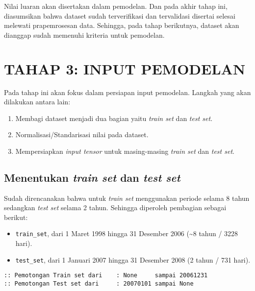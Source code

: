 \documentclass[11pt]{article}
\providecommand{\tightlist}{%
      \setlength{\itemsep}{0pt}\setlength{\parskip}{0pt}}
\let\oldsection\section
\renewcommand\section{\clearpage\oldsection}
\begin{document}
Nilai luaran akan disertakan dalam pemodelan. Dan pada akhir tahap ini,
diasumsikan bahwa dataset sudah terverifikasi dan tervalidasi disertai
selesai melewati prapemrosesan data. Sehingga, pada tahap berikutnya,
dataset akan dianggap sudah memenuhi kriteria untuk pemodelan.

    \hypertarget{tahap-3-input-pemodelan}{%
\section{TAHAP 3: INPUT PEMODELAN}\label{tahap-3-input-pemodelan}}

Pada tahap ini akan fokus dalam persiapan input pemodelan. Langkah yang
akan dilakukan antara lain:

\begin{enumerate}
\def\labelenumi{\arabic{enumi}.}
\tightlist
\item
  Membagi dataset menjadi dua bagian yaitu \emph{train set} dan
  \emph{test set}.
\item
  Normalisasi/Standarisasi nilai pada dataset.
\item
  Mempersiapkan \emph{input tensor} untuk masing-masing \emph{train set}
  dan \emph{test set}.
\end{enumerate}

    \hypertarget{menentukan-train-set-dan-test-set}{%
\subsection{\texorpdfstring{Menentukan \emph{train set} dan \emph{test
set}}{Menentukan train set dan test set}}\label{menentukan-train-set-dan-test-set}}

Sudah direncanakan bahwa untuk \emph{train set} menggunakan periode
selama 8 tahun sedangkan \emph{test set} selama 2 tahun. Sehingga
diperoleh pembagian sebagai berikut:

\begin{itemize}
\tightlist
\item
  \texttt{train\_set}, dari 1 Maret 1998 hingga 31 Desember 2006
  (\textasciitilde{}8 tahun / 3228 hari).
\item
  \texttt{test\_set}, dari 1 Januari 2007 hingga 31 Desember 2008 (2
  tahun / 731 hari).
\end{itemize}

    \begin{Verbatim}[commandchars=\\\{\}]
:: Pemotongan Train set dari    : None     sampai 20061231
:: Pemotongan Test set dari     : 20070101 sampai None
    \end{Verbatim}
\end{document}
